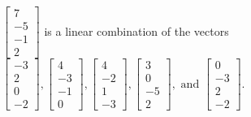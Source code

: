 \begin{exercise}
\begin{exerciseStatement}
  \end{exerciseStatement}
  \begin{exerciseAnswer}
   \(\left[\begin{array}{c}
7 \\
-5 \\
-1 \\
2
\end{array}\right]\) 
  	 is  
	a linear combination of the vectors \(\left[\begin{array}{c}
-3 \\
2 \\
0 \\
-2
\end{array}\right] , \left[\begin{array}{c}
4 \\
-3 \\
-1 \\
0
\end{array}\right] , \left[\begin{array}{c}
4 \\
-2 \\
1 \\
-3
\end{array}\right] , \left[\begin{array}{c}
3 \\
0 \\
-5 \\
2
\end{array}\right] , \text{ and } \left[\begin{array}{c}
0 \\
-3 \\
2 \\
-2
\end{array}\right]\).

	
  


  \end{exerciseAnswer}
\end{exercise}